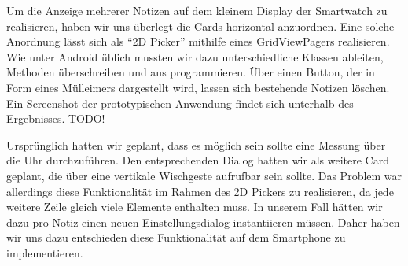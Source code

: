 Um die Anzeige mehrerer Notizen auf dem kleinem Display der Smartwatch zu realisieren, haben wir uns überlegt die Cards horizontal anzuordnen. Eine solche Anordnung lässt sich als "`2D Picker"' mithilfe eines GridViewPagers realisieren. Wie unter Android üblich mussten wir dazu unterschiedliche Klassen ableiten, Methoden überschreiben und aus programmieren. Über einen Button, der in Form eines Mülleimers dargestellt wird, lassen sich bestehende Notizen löschen. Ein Screenshot der prototypischen Anwendung findet sich unterhalb des Ergebnisses. TODO!

Ursprünglich hatten wir geplant, dass es möglich sein sollte eine Messung über die Uhr durchzuführen. Den entsprechenden Dialog hatten wir als weitere Card geplant, die über eine vertikale Wischgeste aufrufbar sein sollte. Das Problem war allerdings diese Funktionalität im Rahmen des 2D Pickers zu realisieren, da jede weitere Zeile gleich viele Elemente enthalten muss. In unserem Fall hätten wir dazu pro Notiz einen neuen Einstellungsdialog instantiieren müssen. Daher haben wir uns dazu entschieden diese Funktionalität auf dem Smartphone zu implementieren.





